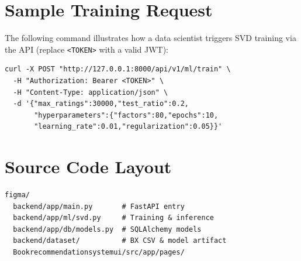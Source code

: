 \documentclass[12pt,a4paper]{report}
\begin{document}
\chapter{Sample Training Request}

The following command illustrates how a data scientist triggers SVD training via the API (replace \texttt{<TOKEN>} with a valid JWT):

\begin{small}
\begin{verbatim}
curl -X POST "http://127.0.0.1:8000/api/v1/ml/train" \
  -H "Authorization: Bearer <TOKEN>" \
  -H "Content-Type: application/json" \
  -d '{"max_ratings":30000,"test_ratio":0.2,
       "hyperparameters":{"factors":80,"epochs":10,
       "learning_rate":0.01,"regularization":0.05}}'
\end{verbatim}
\end{small}

\chapter{Source Code Layout}

\begin{small}
\begin{verbatim}
figma/
  backend/app/main.py       # FastAPI entry
  backend/app/ml/svd.py     # Training & inference
  backend/app/db/models.py  # SQLAlchemy models
  backend/dataset/          # BX CSV & model artifact
  Bookrecommendationsystemui/src/app/pages/
\end{verbatim}
\end{small}
\end{document}
